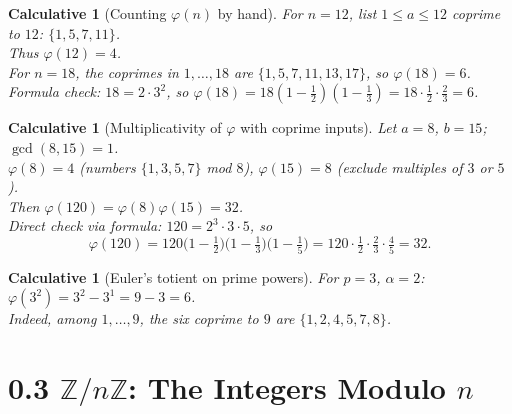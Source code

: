 \documentclass[12pt]{article}
\newtheorem{calculative}[theorem]{Calculative}
\theoremstyle{definition}
\begin{document}
\dotfill

\begin{calculative}[Counting $\varphi(n)$ by hand]

\noindent
For $n=12$, list $1\le a\le 12$ coprime to $12$: $\{1,5,7,11\}$.\\

\noindent
Thus $\varphi(12)=4$.  \\

\noindent
For $n=18$, the coprimes in $1,\dots,18$ are $\{1,5,7,11,13,17\}$, so $\varphi(18)=6$.  \\

\noindent
Formula check: $18=2\cdot 3^2$, so $\varphi(18)=18(1-\frac12)(1-\frac13)=18\cdot \frac12\cdot \frac23=6$.
\end{calculative}

\dotfill

\begin{calculative}[Multiplicativity of $\varphi$ with coprime inputs]

\noindent
Let $a=8$, $b=15$; $\gcd(8,15)=1$.  \\

\noindent
$\varphi(8)=4$ (numbers $\{1,3,5,7\}$ mod $8$), $\varphi(15)=8$ (exclude multiples of $3$ or $5$). \\ 

\noindent
Then $\varphi(120)=\varphi(8)\varphi(15)=32$.  \\

\noindent
Direct check via formula: $120=2^3\cdot 3\cdot 5$, so 
\[
\varphi(120)=120\Big(1-\tfrac12\Big)\Big(1-\tfrac13\Big)\Big(1-\tfrac15\Big)=120\cdot \tfrac12\cdot \tfrac23\cdot \tfrac45=32.
\]
\end{calculative}

\dotfill

\begin{calculative}[Euler’s totient on prime powers]

\noindent
For $p=3$, $\alpha=2$: $\varphi(3^2)=3^2-3^{1}=9-3=6$.  \\

\noindent
Indeed, among $1,\dots,9$, the six coprime to $9$ are $\{1,2,4,5,7,8\}$.
\end{calculative}

\newpage

\section*{0.3 $\mathbb{Z}/n\mathbb{Z}$: The Integers Modulo $n$}
\end{document}
